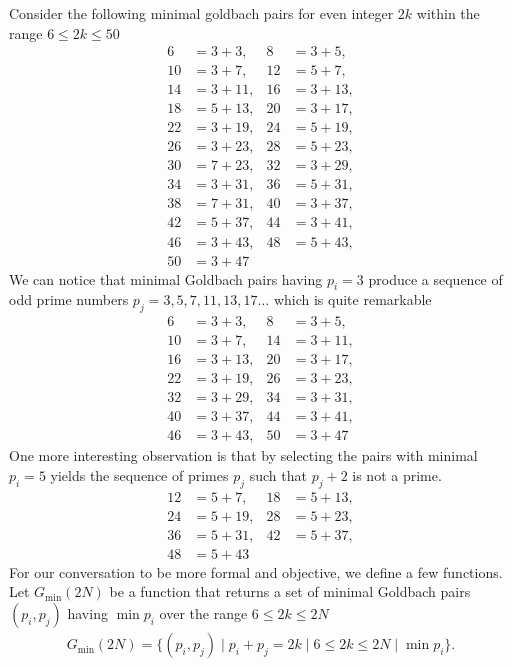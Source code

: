 Consider the following minimal goldbach pairs for even integer $2k$ within the range $6 \leq 2k \leq 50$
\begin{align*}
    6  &= 3 + 3,   & 8  &= 3 + 5,   \\
    10 &= 3 + 7,   & 12 &= 5 + 7,   \\
    14 &= 3 + 11,  & 16 &= 3 + 13,  \\
    18 &= 5 + 13,  & 20 &= 3 + 17,  \\
    22 &= 3 + 19,  & 24 &= 5 + 19,  \\
    26 &= 3 + 23,  & 28 &= 5 + 23,  \\
    30 &= 7 + 23,  & 32 &= 3 + 29,  \\
    34 &= 3 + 31,  & 36 &= 5 + 31,  \\
    38 &= 7 + 31,  & 40 &= 3 + 37,  \\
    42 &= 5 + 37,  & 44 &= 3 + 41,  \\
    46 &= 3 + 43,  & 48 &= 5 + 43,  \\
    50 &= 3 + 47
\end{align*}
We can notice that minimal Goldbach pairs having $p_i=3$ produce a sequence of odd prime numbers
$p_j = 3, 5, 7, 11, 13, 17 \dots$ which is quite remarkable
\begin{align*}
    6  &= 3 + 3,   & 8  &= 3 + 5,   \\
    10 &= 3 + 7,   & 14 &= 3 + 11,  \\
    16 &= 3 + 13,  & 20 &= 3 + 17,  \\
    22 &= 3 + 19,  & 26 &= 3 + 23,  \\
    32 &= 3 + 29,  & 34 &= 3 + 31,  \\
    40 &= 3 + 37,  & 44 &= 3 + 41,  \\
    46 &= 3 + 43,  & 50 &= 3 + 47
\end{align*}
One more interesting observation is that by selecting the pairs with minimal $p_i=5$ yields
the sequence of primes $p_j$ such that $p_j+2$ is not a prime.
\begin{align*}
    12 &= 5 + 7,   & 18 &= 5 + 13,  \\
    24 &= 5 + 19,  & 28 &= 5 + 23,  \\
    36 &= 5 + 31,  & 42 &= 5 + 37,  \\
    48 &= 5 + 43
\end{align*}
For our conversation to be more formal and objective, we define a few functions.
Let $G_{\min} (2N)$ be a function that returns a set of minimal Goldbach pairs $(p_i, p_j)$ having $\min p_i$
over the range $6 \leq 2k \leq 2N$
\begin{align*}
    G_{\min} (2N) = \{(p_i, p_j) \mid p_i + p_j = 2k \mid 6 \leq 2k \leq 2N \mid \min p_i \}.
\end{align*}

